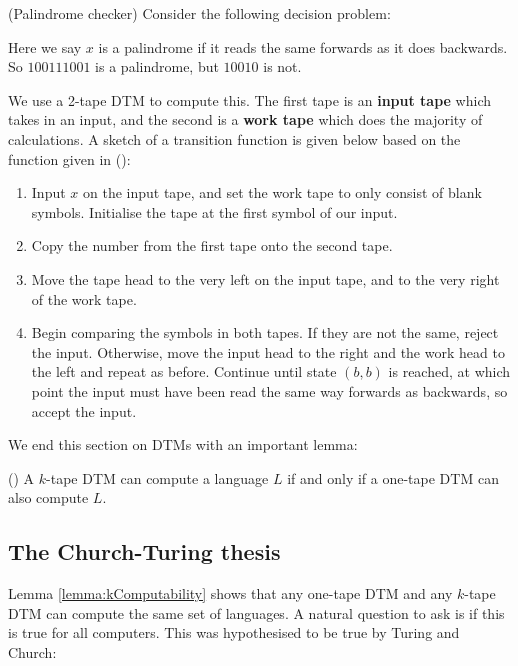 \begin{example}
    (Palindrome checker) Consider the following decision problem:
    

    \medskip
    
    Here we say $x$ is a palindrome if it reads the same forwards as it does backwards. So $100111001$ is a palindrome, but $10010$ is not.
    
    We use a 2-tape DTM to compute this. The first tape is an \textbf{input tape} which takes in an input, and the second is a \textbf{work tape} which does the majority of calculations. A sketch of a transition function is given below based on the function given in (\cite{AroraSanjeev2009Cc:a}):
    
    \begin{enumerate}
        \item Input $x$ on the input tape, and set the work tape to only consist of blank symbols. Initialise the tape at the first symbol of our input.
        \item Copy the number from the first tape onto the second tape.
        \item Move the tape head to the very left on the input tape, and to the very right of the work tape.
        \item Begin comparing the symbols in both tapes. If they are not the same, reject the input. Otherwise, move the input head to the right and the work head to the left and repeat as before. Continue until state $(b,b)$ is reached, at which point the input must have been read the same way forwards as backwards, so accept the input.
    \end{enumerate}
\end{example}

We end this section on DTMs with an important lemma:

\begin{lemma}\label{lemma:kComputability}
    (\cite{SipserMichael2013Ittt}) A $k$-tape DTM can compute a language $L$ if and only if a one-tape DTM can also compute $L$.
\end{lemma}

\subsection{The Church-Turing thesis}
Lemma \ref{lemma:kComputability} shows that any one-tape DTM and any $k$-tape DTM can compute the same set of languages. A natural question to ask is if this is true for all computers. This was hypothesised to be true by Turing and Church:

